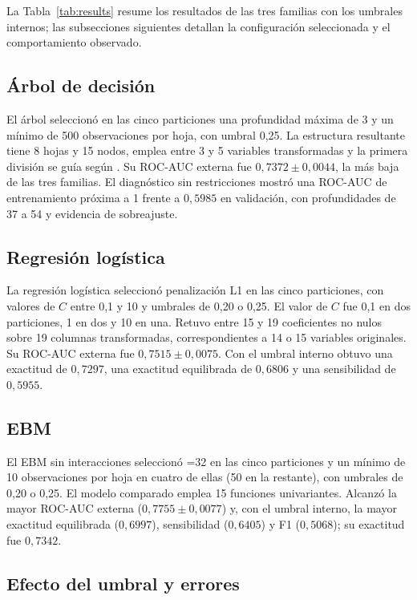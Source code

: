 La Tabla~\ref{tab:results} resume los resultados de las tres familias con los umbrales internos; las subsecciones siguientes detallan la configuración seleccionada y el comportamiento observado.

\subsection{Árbol de decisión}

El árbol seleccionó en las cinco particiones una profundidad máxima de 3 y un mínimo de 500 observaciones por hoja, con umbral 0,25. La estructura resultante tiene 8 hojas y 15 nodos, emplea entre 3 y 5 variables transformadas y la primera división se guía según . Su ROC-AUC externa fue $0{,}7372 \pm 0{,}0044$, la más baja de las tres familias. El diagnóstico sin restricciones mostró una ROC-AUC de entrenamiento próxima a 1 frente a $0{,}5985$ en validación, con profundidades de 37 a 54 y evidencia de sobreajuste.

\subsection{Regresión logística}

La regresión logística seleccionó penalización L1 en las cinco particiones, con valores de $C$ entre 0,1 y 10 y umbrales de 0,20 o 0,25. El valor de $C$ fue 0,1 en dos particiones, 1 en dos y 10 en una. Retuvo entre 15 y 19 coeficientes no nulos sobre 19 columnas transformadas, correspondientes a 14 o 15 variables originales. Su ROC-AUC externa fue $0{,}7515 \pm 0{,}0075$. Con el umbral interno obtuvo una exactitud de $0{,}7297$, una exactitud equilibrada de $0{,}6806$ y una sensibilidad de $0{,}5955$.

\subsection{EBM}

El EBM sin interacciones seleccionó =32 en las cinco particiones y un mínimo de 10 observaciones por hoja en cuatro de ellas (50 en la restante), con umbrales de 0,20 o 0,25. El modelo comparado emplea 15 funciones univariantes. Alcanzó la mayor ROC-AUC externa ($0{,}7755 \pm 0{,}0077$) y, con el umbral interno, la mayor exactitud equilibrada ($0{,}6997$), sensibilidad ($0{,}6405$) y F1 ($0{,}5068$); su exactitud fue $0{,}7342$.

\subsection{Efecto del umbral y errores}

